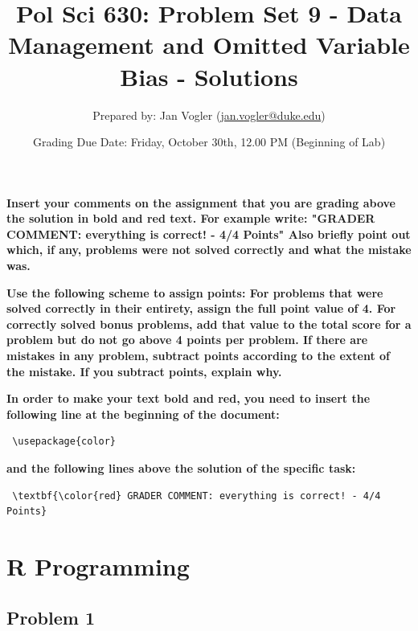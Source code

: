 \documentclass[12pt]{article}\usepackage[]{graphicx}\usepackage[]{color}
\begin{document}
\title{Pol Sci 630: Problem Set 9 - Data Management and Omitted Variable Bias - Solutions}

\author{Prepared by: Jan Vogler (\href{mailto:jan.vogler@duke.edu}{jan.vogler@duke.edu})}

\date{Grading Due Date: Friday, October 30th, 12.00 PM (Beginning of Lab)}
 
\maketitle



\textbf{\color{red} Insert your comments on the assignment that you are grading above the solution in bold and red text. For example write: "GRADER COMMENT: everything is correct! - 4/4 Points" Also briefly point out which, if any, problems were not solved correctly and what the mistake was.}

\bigskip

\textbf{Use the following scheme to assign points: For problems that were solved correctly in their entirety, assign the full point value of 4. For correctly solved bonus problems, add that value to the total score for a problem but do not go above 4 points per problem. If there are mistakes in any problem, subtract points according to the extent of the mistake. If you subtract points, explain why.}

\bigskip

\textbf{In order to make your text bold and red, you need to insert the following line at the beginning of the document:}

\begin{verbatim} \usepackage{color} \end{verbatim}

\textbf{and the following lines above the solution of the specific task:}

\begin{verbatim} \textbf{\color{red} GRADER COMMENT: everything is correct! - 4/4 Points} \end{verbatim}



\pagebreak

\section*{R Programming}

\subsection*{Problem 1}
\end{document}
